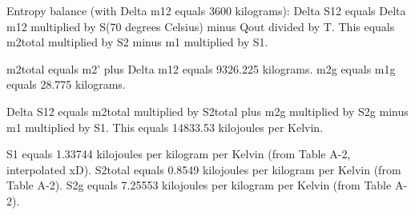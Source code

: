 Entropy balance (with Delta m12 equals 3600 kilograms):  
Delta S12 equals Delta m12 multiplied by S(70 degrees Celsius) minus Qout divided by T.  
This equals m2total multiplied by S2 minus m1 multiplied by S1.  

m2total equals m2' plus Delta m12 equals 9326.225 kilograms.  
m2g equals m1g equals 28.775 kilograms.  

Delta S12 equals m2total multiplied by S2total plus m2g multiplied by S2g minus m1 multiplied by S1.  
This equals 14833.53 kilojoules per Kelvin.  

S1 equals 1.33744 kilojoules per kilogram per Kelvin (from Table A-2, interpolated xD).  
S2total equals 0.8549 kilojoules per kilogram per Kelvin (from Table A-2).  
S2g equals 7.25553 kilojoules per kilogram per Kelvin (from Table A-2).
